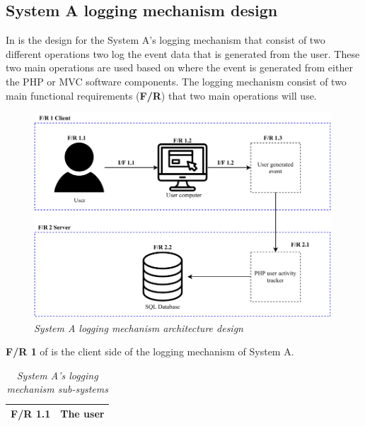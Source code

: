 \clearpage

\subsection{System A logging mechanism design}

In  is the design for the System A's logging mechanism that consist of two different operations two log the event data that is generated from the user. These two main operations are used based on where the event is generated from either the PHP or MVC software components. The logging mechanism consist of two main functional requirements (\textbf{F/R}) that two main operations will use.

\begin{figure}[!htb] %
	\centering %
	\includegraphics[width=0.99\textwidth]{Images/Chapter2/SystemA_Architecture_Diagram/SystemA_Architecture_Diagram.pdf}
	\caption[System A logging mechanism architecture design]
	{\textit{System A logging mechanism architecture design}}\label{fig:SystemA_Arch_Design}
\end{figure}

\textbf{F/R 1} of  is the client side of the logging mechanism of System A.

\begin{table}[!htb]
	\centering
	\small
	\caption[System A's logging mechanism sub-systems]
	{\textit{System A's logging mechanism sub-systems}}
	\label{tbl:SystemA_SubSystems}
	\begin{tabularx}{\textwidth}{|l|X|}
		\hline \textbf{F/R 1.1} & The user \\
		\hline
	\end{tabularx}
\end{table}

